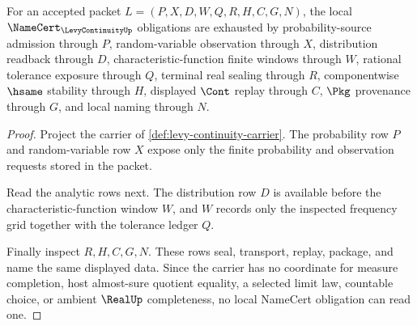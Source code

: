 \begin{theorem}
\label{thm:levy-continuity-namecert-obligations}
For an accepted packet $L=(P,X,D,W,Q,R,H,C,G,N)$, the local $\NameCert_{\LevyContinuityUp}$ obligations are exhausted by probability-source admission through $P$, random-variable observation through $X$, distribution readback through $D$, characteristic-function finite windows through $W$, rational tolerance exposure through $Q$, terminal real sealing through $R$, componentwise $\hsame$ stability through $H$, displayed $\Cont$ replay through $C$, $\Pkg$ provenance through $G$, and local naming through $N$.
\end{theorem}
\begin{proof}
Project the carrier of \autoref{def:levy-continuity-carrier}. The probability row $P$ and random-variable row $X$ expose only the finite probability and observation requests stored in the packet.

Read the analytic rows next. The distribution row $D$ is available before the characteristic-function window $W$, and $W$ records only the inspected frequency grid together with the tolerance ledger $Q$.

Finally inspect $R,H,C,G,N$. These rows seal, transport, replay, package, and name the same displayed data. Since the carrier has no coordinate for measure completion, host almost-sure quotient equality, a selected limit law, countable choice, or ambient $\RealUp$ completeness, no local NameCert obligation can read one.
\end{proof}

